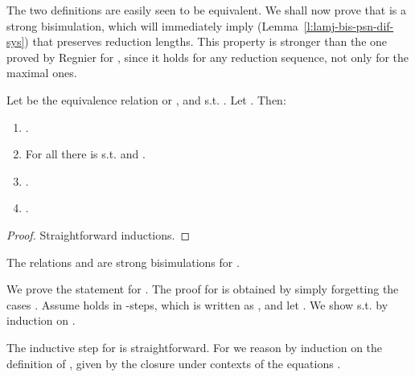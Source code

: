 \documentclass{LMCS}
\renewcommand{\>}{\rightarrow}
\begin{document}
The two definitions are easily seen to be equivalent.  We shall now
prove that  is a strong bisimulation, which will immediately
imply (Lemma~\ref{l:lamj-bis-psn-dif-sys}) that  preserves
reduction lengths. This property is stronger than the one proved by
Regnier for , since it holds for any reduction sequence,
not only for the maximal ones.  \medskip

\begin{lem}
\label{l:eqo-stability}
Let  be the equivalence relation  or , and  s.t. . Let . Then:
\begin{enumerate}[\rm(1)]
  \item \label{l:eqo-stability-minus} .
  \item \label{l:eqo-stability-zero} For all  
  there is 
   s.t.
   and  
  . 
  \item \label{l:eqo-stability-two}  .
  \item \label{l:eqo-stability-one}  .
  \end{enumerate}      
 \end{lem}

\begin{proof}
 Straightforward inductions.
\end{proof}



\begin{lem}
\label{l:eqo-bisim}
The relations  and  are   strong bisimulations for . 
\end{lem}




\proof
We prove the statement for . The proof for  is obtained by 
simply forgetting the cases .
Assume  holds in -steps, which is written as
, and let . We show 
s.t.    by induction on
.  

The inductive step for  is straightforward. For 
  we reason by induction on the definition of
, given by the closure under contexts of the equations
.
 
\end{document}
